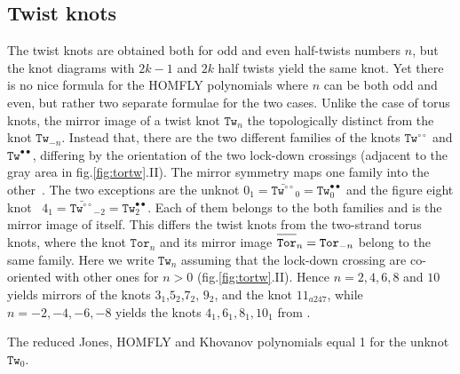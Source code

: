 \documentclass[11pt]{article}
\def\Tor{\mathtt{Tor}}
\def\Tw{\mathtt{Tw}}
\begin{document}
\subsection{Twist knots\label{app:coltw}}
The twist knots are obtained both for odd and even half-twists numbers $n$, but the knot diagrams with $2k-1$ and $2k$ half twists yield the same knot. Yet there is no nice formula for the HOMFLY polynomials where $n$ can be both odd and even, but rather two separate formulae for the two cases. Unlike the case of torus knots, the mirror image of a twist knot $\Tw_n$ the topologically distinct from the knot $\Tw_{-n}$. Instead that, there are the two different families of the knots $\Tw^{\circ\circ}$ and $\Tw^{\bullet\bullet}$, differing by the orientation of the two lock-down crossings (adjacent to the gray area in fig.\ref{fig:tortw}.II). The mirror symmetry maps one family into the other~\cite{DM3}. The two exceptions are the unknot $0_1=\bar{\Tw^{\circ\circ}}_0=\Tw^{\bullet\bullet}_0$ and the figure eight knot~\cite{katlas} $4_1=\bar{\Tw^{\circ\circ}}_{-2}=\Tw^{\bullet\bullet}_{2}$. Each of them belongs to the both families and is the mirror image of itself. This differs the twist knots from the two-strand torus knots, where the knot $\Tor_n$ and its mirror image $\overline{\rule{0pt}{3mm}\Tor}_n=\Tor_{-n}$ belong to the same family. Here we write $\Tw_n$ assuming that the lock-down crossing are co-oriented with other ones for $n>0$ (fig.\ref{fig:tortw}.II). Hence $n=2,4,6,8$ and $10$ yields mirrors of the knots $3_1$,$5_2$,$7_2$, $9_2$, and the knot $11_{a247}$, while $n=-2,-4,-6,-8$ yields the knots $4_1,6_1,8_1,10_1$ from \cite{katlas}.

The reduced Jones, HOMFLY and Khovanov polynomials equal 1 for the unknot $\Tw_0$.
\end{document}
